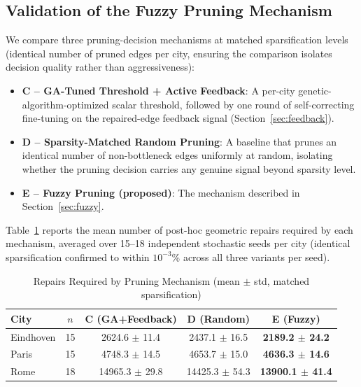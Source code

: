 \subsection{Validation of the Fuzzy Pruning Mechanism}
\label{sec:fuzzy-results}

We compare three pruning-decision mechanisms at matched sparsification levels (identical number of pruned edges per city, ensuring the comparison isolates decision quality rather than aggressiveness):
\begin{itemize}
    \item \textbf{C -- GA-Tuned Threshold + Active Feedback}: A per-city genetic-algorithm-optimized scalar threshold, followed by one round of self-correcting fine-tuning on the repaired-edge feedback signal (Section~\ref{sec:feedback}).
    \item \textbf{D -- Sparsity-Matched Random Pruning}: A baseline that prunes an identical number of non-bottleneck edges uniformly at random, isolating whether the pruning decision carries any genuine signal beyond sparsity level.
    \item \textbf{E -- Fuzzy Pruning (proposed)}: The mechanism described in Section~\ref{sec:fuzzy}.
\end{itemize}

Table~\ref{tab:fuzzy-results} reports the mean number of post-hoc geometric repairs required by each mechanism, averaged over 15--18 independent stochastic seeds per city (identical sparsification confirmed to within $10^{-3}$\% across all three variants per seed).

\begin{table}[h]
\centering
\caption{Repairs Required by Pruning Mechanism (mean $\pm$ std, matched sparsification)}
\begin{tabular}{lcccc}
\toprule
City & $n$ & C (GA+Feedback) & D (Random) & \textbf{E (Fuzzy)} \\
\midrule
Eindhoven & 15 & 2624.6 $\pm$ 11.4 & 2437.1 $\pm$ 16.5 & \textbf{2189.2 $\pm$ 24.2} \\
Paris     & 15 & 4748.3 $\pm$ 14.5 & 4653.7 $\pm$ 15.0 & \textbf{4636.3 $\pm$ 14.6} \\
Rome      & 18 & 14965.3 $\pm$ 29.8 & 14425.3 $\pm$ 54.3 & \textbf{13900.1 $\pm$ 41.4} \\
\bottomrule
\end{tabular}
\label{tab:fuzzy-results}
\end{table}

